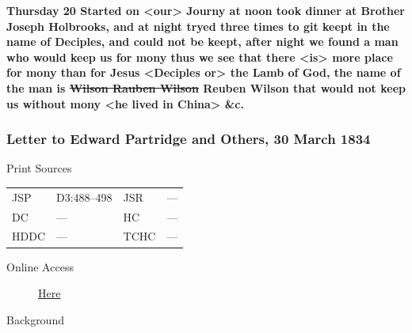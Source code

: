 					\textbf{Thursday 20 Started on <our> Journy at noon took dinner at Brother Joseph Holbrooks, and at night tryed three times to git keept in the name of Deciples, and could not be keept, after night we found a man who would keep us for mony thus we see that there <is> more place for mony than for Jesus <Deciples or> the Lamb of God, the name of the man is \sout{Wilson Rauben Wilson} Reuben Wilson that would not keep us without mony <he lived in China> \&c.}
					
		\subsubsection{Letter to Edward Partridge and Others, 30 March 1834}
			\label{EMS-1834-JS-30-MAR-1834}
			
			\begin{description}
					\item[Print Sources]
				\end{description}

					\begin{tabular}{p{0.5in}p{1in}p{0.5in}p{1in}}
					JSP	 	& D3:488--498		& JSR 		& --- \\
					DC	 	& --- 		& HC 		& --- \\
					HDDC 	& ---		& TCHC 		& --- \\
					\end{tabular}
				
				\begin{description}
					\item[Online Access] \href{https://www.josephsmithpapers.org/paper-summary/letter-to-edward-partridge-and-others-30-march-1834/1}{Here}
				\end{description}
				
				\begin{description}
					\item[Background]
				\end{description}
				
				
